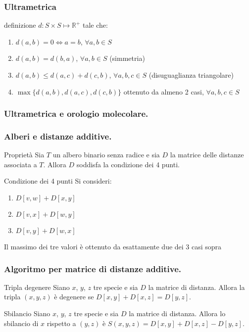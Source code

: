 \begin{frame}[fragile]
\frametitle{Ultrametrica}
\begin{block}{definizione}
$d: S \times S \mapsto \mathbb{R}^{+}$ tale che:
\begin{enumerate}
\item
$d(a,b) = 0 \Leftrightarrow a=b$, $\forall a,b\in S$
\item
$d(a,b) = d(b,a)$, $\forall a,b\in S$ (simmetria)
\item
$d(a,b) \le d(a,c) + d(c,b)$, $\forall a,b,c\in S$ (disuguaglianza triangolare)
\item
$\max\{d(a,b), d(a,c), d(c,b) \}$ ottenuto da almeno 2 casi, $\forall a,b,c\in S$
\end{enumerate}
\end{block}
\end{frame}



\begin{frame}[fragile]
\frametitle{Ultrametrica e orologio molecolare.}
\end{frame}

\begin{frame}[fragile]
\frametitle{Alberi e distanze additive.}
\begin{block}{Proprietà}
Sia $T$ un albero binario senza radice e sia $D$ la matrice delle distanze associata a $T$.
Allora $D$ soddisfa la condizione dei 4 punti.
\end{block}
\begin{block}{Condizione dei 4 punti}
Si consideri:
\begin{enumerate}
\item
$D[v,w] + D[x,y]$
\item
$D[v,x] + D[w,y]$
\item
$D[v,y] + D[w,x]$
\end{enumerate}
Il massimo dei tre valori è ottenuto da esattamente due dei 3 casi sopra
\end{block}
\end{frame}

\begin{frame}[fragile]
\frametitle{Algoritmo per matrice di distanze additive.}
\begin{block}{Tripla degenere}
Siano $x$, $y$, $z$ tre specie e sia $D$ la matrice di distanza.
Allora la tripla $(x,y,z)$ è \alert{degenere} se $D[x,y] + D[x,z] = D[y,z]$.
\end{block}

\begin{block}{Sbilancio}
Siano $x$, $y$, $z$ tre specie e sia $D$ la matrice di distanza.
Allora lo sbilancio di $x$ rispetto a $(y,z)$ è $S(x, y, z) = D[x,y] + D[x,z] - D[y,z]$.
\end{block}
\end{frame}

